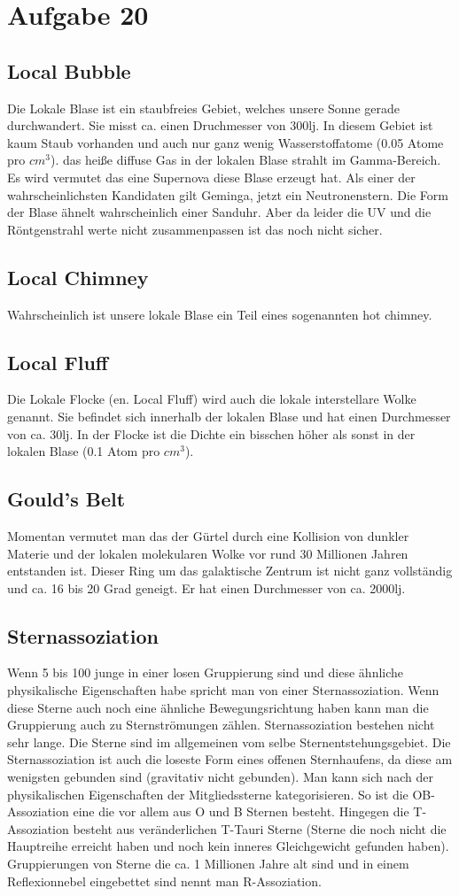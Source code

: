 \section{Aufgabe 20}
\subsection{Local Bubble}
Die Lokale Blase ist ein staubfreies Gebiet, welches unsere Sonne gerade durchwandert. Sie misst ca. einen Druchmesser von 300lj. In diesem Gebiet ist kaum Staub vorhanden und auch nur ganz wenig Wasserstoffatome (0.05 Atome pro $cm^3$). das heiße diffuse Gas in der lokalen Blase strahlt im Gamma-Bereich. Es wird vermutet das eine Supernova diese Blase erzeugt hat. Als einer der wahrscheinlichsten Kandidaten gilt Geminga, jetzt ein Neutronenstern. Die Form der Blase ähnelt wahrscheinlich einer Sanduhr. Aber da leider die UV und die Röntgenstrahl werte nicht zusammenpassen ist das noch nicht sicher. 
\subsection{Local Chimney}
Wahrscheinlich ist unsere lokale Blase ein Teil eines sogenannten hot chimney.
\subsection{Local Fluff}
Die Lokale Flocke (en. Local Fluff) wird auch die lokale interstellare Wolke genannt. Sie befindet sich innerhalb der lokalen Blase und hat einen Durchmesser von ca. 30lj. In der Flocke ist die Dichte ein bisschen höher als sonst in der lokalen Blase (0.1 Atom pro $cm^3$).
\subsection{Gould's Belt}
Momentan vermutet man das der Gürtel durch eine Kollision von dunkler Materie und der lokalen molekularen Wolke vor rund 30 Millionen Jahren entstanden ist. Dieser Ring um das galaktische Zentrum ist nicht ganz vollständig und ca. 16 bis 20 Grad geneigt. Er hat einen Durchmesser von ca. 2000lj.
\subsection{Sternassoziation}
Wenn 5 bis 100 junge in einer losen Gruppierung sind und diese ähnliche physikalische Eigenschaften habe spricht man von einer Sternassoziation. Wenn diese Sterne auch noch eine ähnliche Bewegungsrichtung haben kann man die Gruppierung auch zu Sternströmungen zählen. Sternassoziation bestehen nicht sehr lange. Die Sterne sind im allgemeinen vom selbe Sternentstehungsgebiet. Die Sternassoziation ist auch die loseste Form eines offenen Sternhaufens, da diese am wenigsten gebunden sind (gravitativ nicht gebunden). Man kann sich nach der physikalischen Eigenschaften der Mitgliedssterne kategorisieren. 
So ist die OB-Assoziation eine die vor allem aus O und B Sternen besteht. Hingegen die T-Assoziation besteht aus veränderlichen T-Tauri Sterne (Sterne die noch nicht die Hauptreihe erreicht haben und noch kein inneres Gleichgewicht gefunden haben).
Gruppierungen von Sterne die ca. 1 Millionen Jahre alt sind und in einem Reflexionnebel eingebettet sind nennt man R-Assoziation.
